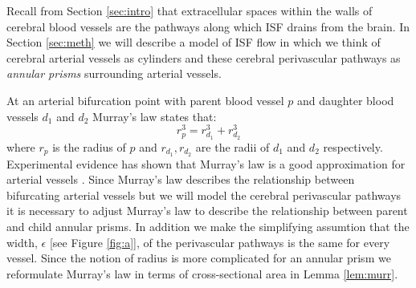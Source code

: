 \documentclass[10pt]{amsart} %
\theoremstyle{definition}
\begin{document}
Recall from Section \ref{sec:intro} that extracellular spaces within the walls of cerebral blood vessels are the pathways along which 
ISF drains from the brain. In Section \ref{sec:meth} we will describe a model of ISF flow in which we think of cerebral 
arterial vessels as cylinders and these cerebral perivascular pathways as \emph{annular prisms} surrounding arterial vessels.  

At an arterial bifurcation point with parent blood vessel $p$ and daughter blood vessels $d_{1}$ and $d_2$ Murray's 
law \cite{Murray} 
states that:
\[r_{p}^{3} = r_{d_{1}}^{3} + r_{d_{2}}^{3}\]
where $r_{p}$ is the radius of $p$ and $r_{d_{1}},r_{d_{2}}$ are the radii of $d_{1}$ and 
$d_{2}$ respectively.  Experimental evidence has shown that Murray's law is a good approximation for 
arterial vessels \cite{Zamir,cohn}.  Since Murray's law describes the relationship between bifurcating arterial vessels  
but we will model the cerebral perivascular pathways it is necessary to adjust Murray's law to describe 
the relationship between parent and child annular prisms. In addition we make the simplifying assumtion that the width,
$\epsilon$ [see Figure \ref{fig:a}], of the perivascular pathways is the same for every vessel. Since the notion of radius is more 
complicated for an annular prism we reformulate Murray's law in terms of cross-sectional area in Lemma \ref{lem:murr}.   
\end{document}
